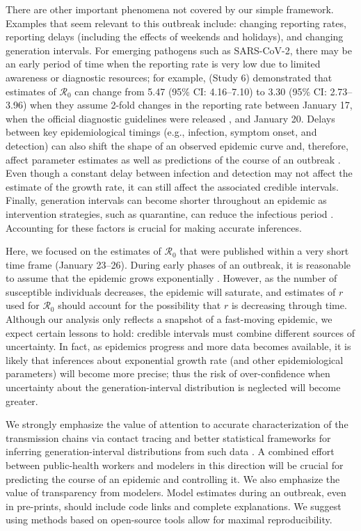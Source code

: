 \documentclass[12pt]{article}
\newcommand{\Ro}{\ensuremath{{\mathcal R}_{0}}\xspace}
\begin{document}
There are other important phenomena not covered by our simple framework. 
Examples that seem relevant to this outbreak include: changing reporting rates, reporting delays (including the effects of weekends and holidays), and changing generation intervals.
For emerging pathogens such as SARS-CoV-2, there may be an early period of time when the reporting rate is very low due to limited awareness or diagnostic resources;
for example, \cite{zhaoncov} (Study 6) demonstrated that estimates of \Ro can change from 5.47 (95\% CI: 4.16--7.10) to 3.30 (95\% CI: 2.73--3.96) when they assume 2-fold changes in the reporting rate between January 17, when the official diagnostic guidelines were released \citep{who17protocol}, and January 20.
Delays between key epidemiological timings (e.g., infection, symptom onset, and detection) can also shift the shape of an observed epidemic curve and, therefore, affect parameter estimates as well as predictions of the course of an outbreak \citep{tariq2019assessing}.
Even though a constant delay between infection and detection may not affect the estimate of the growth rate, it can still affect the associated credible intervals.
Finally, generation intervals can become shorter throughout an epidemic as intervention strategies, such as quarantine, can reduce the infectious period \citep{hethcote2002effects}.
Accounting for these factors is crucial for making accurate inferences.

Here, we focused on the estimates of \Ro that were published within a very short time frame (January 23--26).
During early phases of an outbreak, it is reasonable to assume that the epidemic grows exponentially \citep{anderson1991infectious}. However, as the number of susceptible individuals decreases, the epidemic will saturate, and estimates of $r$ used for \Ro should account for the possibility that $r$ is decreasing through time.
Although our analysis only reflects a snapshot of a fast-moving epidemic, we expect certain lessons to hold: credible intervals must combine different sources of uncertainty. 
In fact, as epidemics progress and more data becomes available, it is likely that inferences about exponential growth rate (and other epidemiological parameters) will become more precise; thus the risk of over-confidence when uncertainty about the generation-interval distribution is neglected will become greater.

We strongly emphasize the value of attention to accurate characterization of the transmission chains via contact tracing and better statistical frameworks for inferring generation-interval distributions from such data \citep{britton2019estimation}.
A combined effort between public-health workers and modelers in this direction will be crucial for predicting the course of an epidemic and controlling it.
We also emphasize the value of transparency from modelers.
Model estimates during an outbreak, even in pre-prints, should include code links and complete explanations.
We suggest using methods based on open-source tools allow for maximal reproducibility.
\end{document}
